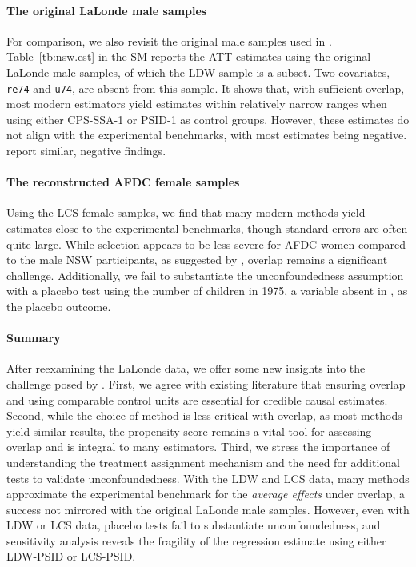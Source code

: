 \documentclass[letterpaper,12pt,leqno]{article}
\begin{document}
\paragraph{The original LaLonde male samples} For comparison, we also revisit the original male samples used in \citet{LaLonde}. Table~\ref{tb:nsw.est} in the SM reports the ATT estimates using the original LaLonde male samples, of which the LDW sample is a subset. Two covariates, \texttt{re74} and \texttt{u74}, are absent from this sample. It shows that, with sufficient overlap, most modern estimators yield estimates within relatively narrow ranges when using either CPS-SSA-1 or PSID-1 as control groups. However, these estimates do not align with the experimental benchmarks, with most estimates being negative. \citet{smith2001reconciling, smith2005does} report similar, negative findings. 

\paragraph{The reconstructed AFDC female samples} Using the LCS female samples, we find that many modern methods yield estimates close to the experimental benchmarks, though standard errors are often quite large. While selection appears to be less severe for AFDC women compared to the male NSW participants, as suggested by \citet{calonico2017women}, overlap remains a significant challenge. Additionally, we fail to substantiate the unconfoundedness assumption with a placebo test using the number of children in 1975, a variable absent in \citet{LaLonde}, as the placebo outcome.   

\paragraph{Summary} After reexamining the LaLonde data, we offer some new insights into the challenge posed by \citet{LaLonde}. First, we agree with existing literature that ensuring overlap and using comparable control units are essential for credible causal estimates. Second, while the choice of method is less critical with overlap, as most methods yield similar results, the propensity score remains a vital tool for assessing overlap and is integral to many estimators. Third, we stress the importance of understanding the treatment assignment mechanism and the need for additional tests to validate unconfoundedness. With the LDW and LCS data, many methods approximate the experimental benchmark for the \emph{average effects} under overlap, a success not mirrored with the original LaLonde male samples. However, even with LDW or LCS data, placebo tests fail to substantiate unconfoundedness, and sensitivity analysis reveals the fragility of the regression estimate using either LDW-PSID or LCS-PSID.
\end{document}
